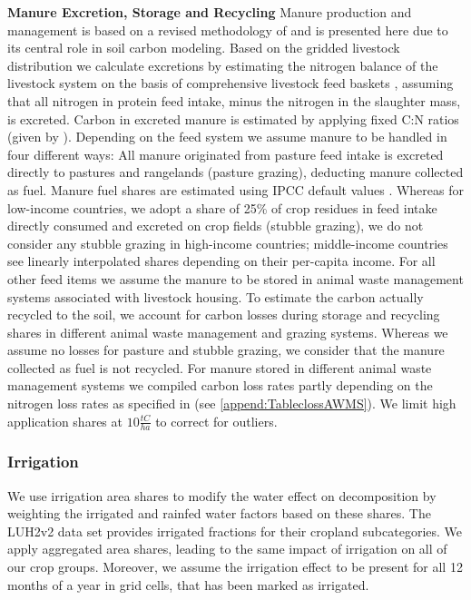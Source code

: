 \documentclass[gc, manuscript]{copernicus}
\begin{document}
\textbf{Manure Excretion, Storage and Recycling}
Manure production and management is based on a revised methodology of \citep{bodirsky_n2o_2012} and is presented here due to its central role in soil carbon modeling. Based on the gridded livestock distribution we calculate excretions by estimating the nitrogen balance of the livestock system on the basis of comprehensive livestock feed baskets \citep{weindl_livestock_2017}, assuming that all nitrogen in protein feed intake, minus the nitrogen in the slaughter mass, is excreted. Carbon in excreted manure is estimated by applying fixed C:N ratios (given by \citep{ipcc_2019_2019}).
Depending on the feed system we assume manure to be handled in four different ways:
All manure originated from pasture feed intake is excreted directly to pastures and rangelands (pasture grazing), deducting manure collected as fuel. Manure fuel shares are estimated using IPCC default values \citep{ipcc_2006_2006}.
Whereas for low-income countries, we adopt a share of 25\% of crop residues in feed intake directly consumed and excreted on crop fields (stubble grazing), we do not consider any stubble grazing in high-income countries; middle-income countries see linearly interpolated shares depending on their per-capita income.
For all other feed items we assume the manure to be stored in animal waste management systems associated with livestock housing.
To estimate the carbon actually recycled to the soil, we account for carbon losses during storage and recycling shares in different animal waste management and grazing systems. Whereas we assume no losses for pasture and stubble grazing, we consider that the manure collected as fuel is not recycled. For manure stored in different animal waste management systems we compiled carbon loss rates partly depending on the nitrogen loss rates as specified in \citep{bodirsky_n2o_2012} (see \ref{append:TableclossAWMS}). We limit high application shares at \(10\tfrac{\unit{tC}}{\unit{ha}}\) to correct for outliers.

\hypertarget{sec:irrigation}{%
\subsubsection{Irrigation}\label{sec:irrigation}}

We use irrigation area shares to modify the water effect on decomposition by weighting the irrigated and rainfed water factors based on these shares. The LUH2v2 \citep{hurtt_harmonization_2020} data set provides irrigated fractions for their cropland subcategories. We apply aggregated area shares, leading to the same impact of irrigation on all of our crop groups. Moreover, we assume the irrigation effect to be present for all 12 months of a year in grid cells, that has been marked as irrigated.
\end{document}
